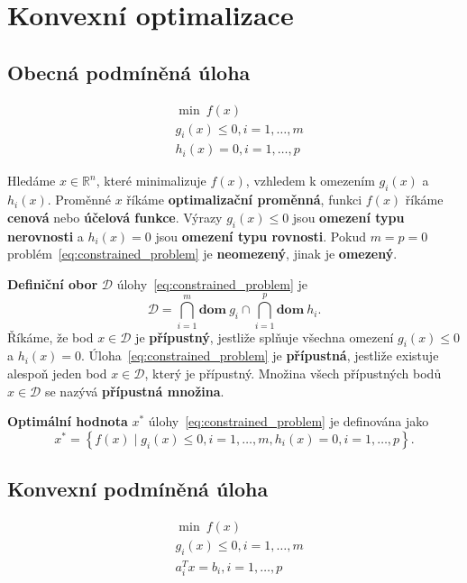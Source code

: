 \chapter{Konvexní optimalizace}

\section{Obecná podmíněná úloha}

\begin{equation}\label{eq:constrained_problem}
    \begin{split}
        &\min\ f(x) \\
        &g_i(x) \leq 0, i = 1, \dots, m \\
        &h_i(x) = 0, i = 1, \dots, p
    \end{split}
\end{equation}

Hledáme $x \in \mathbb{R}^n$, které minimalizuje $f(x)$, vzhledem k omezením $g_i(x)$ a $h_i(x)$. Proměnné $x$ říkáme \textbf{optimalizační proměnná}, funkci $f(x)$ říkáme \textbf{cenová} nebo \textbf{účelová funkce}. Výrazy $g_i(x) \leq 0$ jsou \textbf{omezení typu nerovnosti} a $h_i(x) = 0$ jsou \textbf{omezení typu rovnosti}. Pokud $m = p = 0$ problém~\ref{eq:constrained_problem} je \textbf{neomezený}, jinak je \textbf{omezený}.

\textbf{Definiční obor} $\mathcal{D}$ úlohy~\ref{eq:constrained_problem} je
$$
    \mathcal{D} = \bigcap_{i=1}^m \textbf{dom}\ g_i \cap \bigcap_{i=1}^p \textbf{dom}\ h_i.
$$
Říkáme, že bod $x \in \mathcal{D}$ je \textbf{přípustný}, jestliže splňuje všechna omezení $g_i(x) \leq 0$ a $h_i(x) = 0$. Úloha~\ref{eq:constrained_problem} je \textbf{přípustná}, jestliže existuje alespoň jeden bod $x \in \mathcal{D}$, který je přípustný. Množina všech přípustných bodů $x \in \mathcal{D}$ se nazývá \textbf{přípustná množina}.

\textbf{Optimální hodnota} $x^*$ úlohy~\ref{eq:constrained_problem} je definována jako
$$
    x^* = \left\{ f(x) \mid g_i(x) \leq 0, i = 1, \dots, m, h_i(x) = 0, i = 1, \dots, p \right\}.
$$

\section{Konvexní podmíněná úloha}

\begin{equation}\label{eq:convex_problem}
    \begin{split}
        &\min\ f(x) \\
        &g_i(x) \leq 0, i = 1, \dots, m \\
        &a_i^Tx = b_i, i = 1, \dots, p
    \end{split}
\end{equation}

